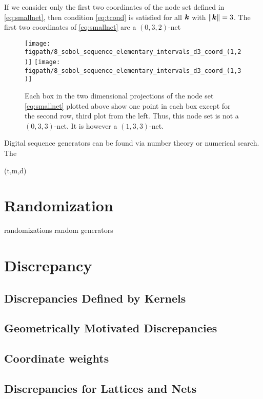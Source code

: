 \documentclass{svproc}
\newcommand{\figpath}{Figures}
\begin{document}
If we consider only the first two coordinates of the node set defined in \eqref{eq:smallnet}, then  condition \eqref{eq:tcond} is satisfied for all ${\boldsymbol{k}}$ with $\lVert {\boldsymbol{k}} \rVert = 3$.  The first two coordinates of \eqref{eq:smallnet} are a $(0,3,2)$-net



\begin{figure}
	\centering
	\texttt{[image: \\figpath/8\_sobol\_sequence\_elementary\_intervals\_d3\_coord\_(1,2)]}
	\texttt{[image: \\figpath/8\_sobol\_sequence\_elementary\_intervals\_d3\_coord\_(1,3)]}
	\caption{Each box in the two dimensional projections of the node set \eqref{eq:smallnet} plotted above show one point in each box except for the second row, third plot from the left.  Thus, this node set is not a $(0,3,3)$-net.  It is however a $(1,3,3)$-net.  \label{fig:elementinterval}}
\end{figure}



Digital sequence generators can be found via number theory or numerical search.  The

(t,m,d)

\section{Randomization} \label{sec:random}
randomizations
random generators

\section{Discrepancy} \label{sec:discrepancy}
\subsection{Discrepancies Defined by Kernels} \label{sec:kerdisc}
\subsection{Geometrically Motivated Discrepancies} \label{sec:geodisc}
\subsection{Coordinate weights} \label{sec:coordwts}
\subsection{Discrepancies for Lattices and Nets} \label{sec:kerdisc}
\end{document}
